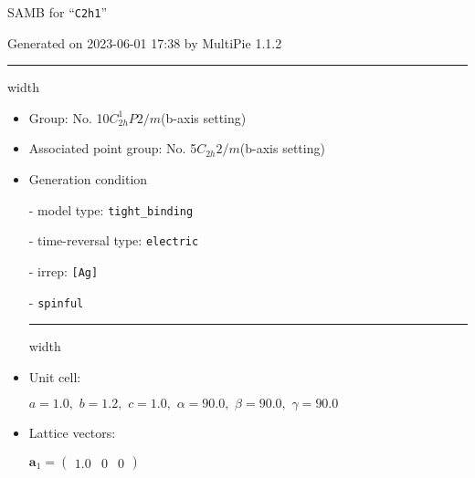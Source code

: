 \documentclass[fleqn,10pt,landscape]{article}
\begin{document}
\setcounter{MaxMatrixCols}{16}

\setlength{\baselineskip}{16pt}
\footnotesize
\begin{center}
\LARGE
SAMB for ``\texttt{C2h1}''
\end{center}
\begin{flushright}
Generated on 2023-06-01 17:38 by MultiPie 1.1.2
\end{flushright}
\vspace{1cm}


 \hfil \hrule height 1mm width \textwidth \hfil

\begin{itemize}
\item Group: No. 10\quad$C_{2h}^{1}$\quad$P2/m$\quad(b-axis setting)\quad[ monoclinic ]

\item Associated point group: No. 5\quad$C_{2h}$\quad$2/m$\quad(b-axis setting)\quad[ monoclinic ]

\vspace{5mm}

\item Generation condition

\quad - model type: \texttt{tight_binding}

\quad - time-reversal type: \texttt{electric}

\quad - irrep: \texttt{[Ag]}

\quad - \texttt{spinful}


 \hfil \hrule height 1mm width \textwidth \hfil

\item Unit cell:

\quad $a=1.0,\,\, b=1.2,\,\, c=1.0,\,\, \alpha=90.0,\,\, \beta=90.0,\,\, \gamma=90.0$

\item Lattice vectors:

\quad $\bm{a}_1=\begin{pmatrix} 1.0 & 0 & 0 \end{pmatrix}$


\end{itemize}
\end{document}
